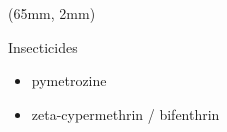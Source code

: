 \begin{frame}{}
\begin{textblock*}{55mm}
{\begin{center}
            \end{center}
        }
    \end{textblock*}
%
    \begin{textblock*}{60mm}(65mm, 2mm)
        \begin{yellowbox}{Insecticides}
            \begin{itemize}
                \item 
                    pymetrozine
                 \item 
                    zeta-cypermethrin / bifenthrin
            \end{itemize}
        \end{yellowbox}
        \begin{graybox}{}
            \begin{bibunit}[apalike]
                \nocite{Shun-xiang2001}
                \nocite{Smith2014}
                \putbib
            \end{bibunit}
        \end{graybox}
    \end{textblock*}
\end{frame}
